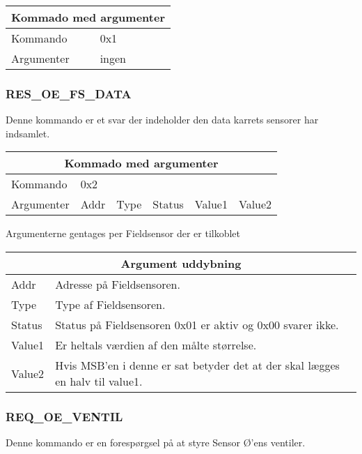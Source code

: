 \begin{table}[H]
\setlength{\parindent}{12pt}
\begin{tabular}{|l|lcc|}
\hline
\multicolumn{4}{|c|}{Kommado med argumenter}\\\hline
Kommando & 0x1 & & \\
Argumenter & ingen & & \\\hline
\end{tabular}
\end{table}



\subsubsection{RES\_OE\_FS\_DATA}
Denne kommando er et svar der indeholder den data karrets sensorer har indsamlet.

\begin{table}[H]
\setlength{\parindent}{12pt}
\begin{tabular}{|l|lcccc|}
\hline
\multicolumn{6}{|c|}{Kommado med argumenter}\\\hline
Kommando & 0x2 & & & & \\
Argumenter & Addr & Type & Status & Value1 & Value2 \\\hline
\end{tabular}
\end{table}

Argumenterne gentages per Fieldsensor der er tilkoblet

\begin{table}[H]
\setlength{\parindent}{12pt}
\begin{tabular}{|l|l|}
\hline
\multicolumn{2}{|c|}{Argument uddybning}\\\hline
Addr & Adresse på Fieldsensoren. \\
Type & Type af Fieldsensoren. \\
Status & Status på Fieldsensoren 0x01 er aktiv og 0x00 svarer ikke. \\
Value1 & Er heltals værdien af den målte størrelse. \\
Value2 & Hvis MSB'en i denne er sat betyder det at der skal lægges en halv til value1.\\\hline
\end{tabular}
\end{table}

\subsubsection{REQ\_OE\_VENTIL}
Denne kommando er en forespørgsel på at styre Sensor Ø'ens ventiler.

